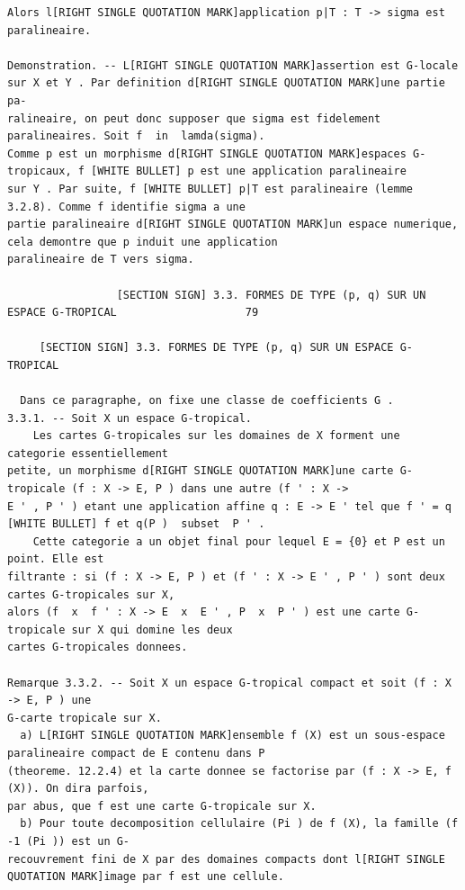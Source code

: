 \documentclass[
  11pt,
]{article}
\begin{document}
\begin{lstlisting}
Alors l[RIGHT SINGLE QUOTATION MARK]application p|T : T -> sigma est paralineaire.

Demonstration. -- L[RIGHT SINGLE QUOTATION MARK]assertion est G-locale sur X et Y . Par definition d[RIGHT SINGLE QUOTATION MARK]une partie pa-
ralineaire, on peut donc supposer que sigma est fidelement paralineaires. Soit f  in  lamda(sigma).
Comme p est un morphisme d[RIGHT SINGLE QUOTATION MARK]espaces G-tropicaux, f [WHITE BULLET] p est une application paralineaire
sur Y . Par suite, f [WHITE BULLET] p|T est paralineaire (lemme 3.2.8). Comme f identifie sigma a une
partie paralineaire d[RIGHT SINGLE QUOTATION MARK]un espace numerique, cela demontre que p induit une application
paralineaire de T vers sigma.

                 [SECTION SIGN] 3.3. FORMES DE TYPE (p, q) SUR UN ESPACE G-TROPICAL                    79

     [SECTION SIGN] 3.3. FORMES DE TYPE (p, q) SUR UN ESPACE G-TROPICAL

  Dans ce paragraphe, on fixe une classe de coefficients G .
3.3.1. -- Soit X un espace G-tropical.
    Les cartes G-tropicales sur les domaines de X forment une categorie essentiellement
petite, un morphisme d[RIGHT SINGLE QUOTATION MARK]une carte G-tropicale (f : X -> E, P ) dans une autre (f ' : X ->
E ' , P ' ) etant une application affine q : E -> E ' tel que f ' = q [WHITE BULLET] f et q(P )  subset  P ' .
    Cette categorie a un objet final pour lequel E = {0} et P est un point. Elle est
filtrante : si (f : X -> E, P ) et (f ' : X -> E ' , P ' ) sont deux cartes G-tropicales sur X,
alors (f  x  f ' : X -> E  x  E ' , P  x  P ' ) est une carte G-tropicale sur X qui domine les deux
cartes G-tropicales donnees.

Remarque 3.3.2. -- Soit X un espace G-tropical compact et soit (f : X -> E, P ) une
G-carte tropicale sur X.
  a) L[RIGHT SINGLE QUOTATION MARK]ensemble f (X) est un sous-espace paralineaire compact de E contenu dans P
(theoreme. 12.2.4) et la carte donnee se factorise par (f : X -> E, f (X)). On dira parfois,
par abus, que f est une carte G-tropicale sur X.
  b) Pour toute decomposition cellulaire (Pi ) de f (X), la famille (f -1 (Pi )) est un G-
recouvrement fini de X par des domaines compacts dont l[RIGHT SINGLE QUOTATION MARK]image par f est une cellule.


\end{lstlisting}
\end{document}
